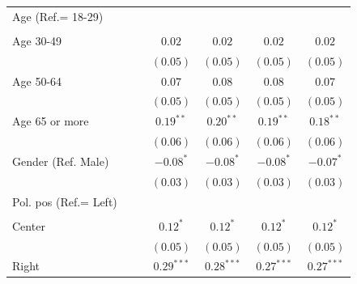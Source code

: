 \documentclass[
  12pt,
  a4paper,
]{article}
\begin{document}
\begin{table}[!ht]
\begin{center}
{\begin{tabular}{l c c c c c c}
Age (Ref.= 18-29)                   &               &               &               &               &               &               \\
                                    &               &               &               &               &               &               \\
\quad Age 30-49                     &               &               & $0.02$        & $0.02$        & $0.02$        & $0.02$        \\
                                    &               &               & $(0.05)$      & $(0.05)$      & $(0.05)$      & $(0.05)$      \\
\quad Age 50-64                     &               &               & $0.07$        & $0.08$        & $0.08$        & $0.07$        \\
                                    &               &               & $(0.05)$      & $(0.05)$      & $(0.05)$      & $(0.05)$      \\
\quad Age 65 or more                &               &               & $0.19^{**}$   & $0.20^{**}$   & $0.19^{**}$   & $0.18^{**}$   \\
                                    &               &               & $(0.06)$      & $(0.06)$      & $(0.06)$      & $(0.06)$      \\
Gender (Ref. Male)                  &               &               & $-0.08^{*}$   & $-0.08^{*}$   & $-0.08^{*}$   & $-0.07^{*}$   \\
                                    &               &               & $(0.03)$      & $(0.03)$      & $(0.03)$      & $(0.03)$      \\
Pol. pos (Ref.= Left)               &               &               &               &               &               &               \\
                                    &               &               &               &               &               &               \\
\quad Center                        &               &               & $0.12^{*}$    & $0.12^{*}$    & $0.12^{*}$    & $0.12^{*}$    \\
                                    &               &               & $(0.05)$      & $(0.05)$      & $(0.05)$      & $(0.05)$      \\
\quad Right                         &               &               & $0.29^{***}$  & $0.28^{***}$  & $0.27^{***}$  & $0.27^{***}$  \\

\end{tabular}}
\end{center}
\end{table}
\end{document}
